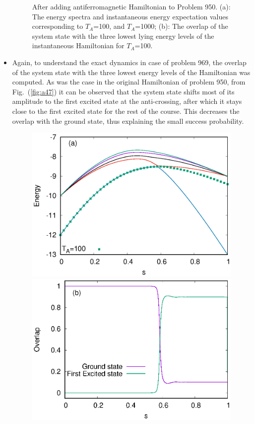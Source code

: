 \documentclass[../main.tex]{subfiles}
\begin{document}
\begin{itemize}
\begin{figure}
  \caption{After adding antiferromagnetic Hamiltonian to Problem 950. (a): The energy spectra and instantaneous energy expectation values corresponding to $T_A$=100, and $T_A$=1000; (b): The overlap of the system state with the three lowest lying energy levels of the instantaneous Hamiltonian for $T_A$=100.}
   \label{fig:a32}
 \end{figure}



\item Again, to understand the exact dynamics in case of problem 969, the overlap of the system state with the three lowest energy levels of the Hamiltonian was computed. As was the case in the original Hamiltonian of problem 950, from Fig.~(\ref{fig:a47}) it can be observed that the system state shifts most of its amplitude to the first excited state at the anti-crossing, after which it stays close to the first excited state for the rest of the course. This decreases the overlap with the ground state, thus explaining the small success probability.
\begin{figure}
\centering
  \includegraphics[scale=0.8]{969_O_T100.eps}
  \includegraphics[scale=0.8]{969_Overlap_Orig.eps}

\end{figure}
\end{itemize}
\end{document}

